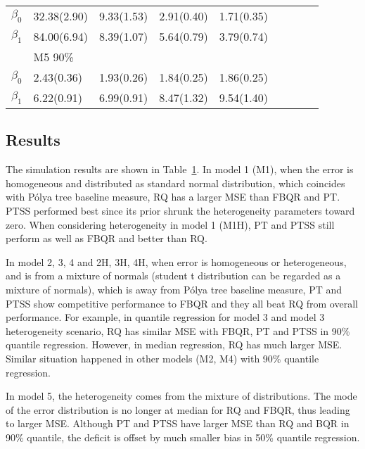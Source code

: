 \documentclass[12pt]{article}
\newcommand{\polya}{P\'{o}lya}
\begin{document}
\begin{center}
\begin{table}[h]
\begin{tabular}[tb]{cllllllll}
      $\beta_0$ & 32.38(2.90) & 9.33(1.53)  & 2.91(0.40)  & 1.71(0.35)  &             &             &             &             \\
      $\beta_1$ & 84.00(6.94) & 8.39(1.07)  & 5.64(0.79)  & 3.79(0.74)  &             &             &             &             \\
                & M5 90\%     &             &             &             &             &             &             &             \\
      $\beta_0$ & 2.43(0.36)  & 1.93(0.26)  & 1.84(0.25)  & 1.86(0.25)  &             &             &             &             \\
      $\beta_1$ & 6.22(0.91)  & 6.99(0.91)  & 8.47(1.32)  & 9.54(1.40)  &             &             &             &             \\
\hline
    \end{tabular}
    \label{ch2:tab:m1}
  \end{table}
\end{center}

\subsection{Results}
The simulation results are shown in Table~\ref{ch2:tab:m1}.
In model 1 (M1), when the error is homogeneous and distributed as standard normal distribution, which coincides with \polya{} tree baseline measure, RQ has a larger MSE than FBQR and PT.
PTSS performed best since its prior shrunk the heterogeneity parameters toward zero.
When considering heterogeneity in model 1 (M1H), PT and PTSS still perform as well as FBQR and better than RQ.

In model 2, 3, 4 and 2H, 3H, 4H, when error is homogeneous or heterogeneous, and is from a mixture of normals (student t distribution can be regarded as a mixture of normals), which is away from \polya{} tree baseline measure,
PT and PTSS show competitive performance to FBQR and they all beat RQ from overall performance.
For example, in quantile regression for model 3 and model 3 heterogeneity scenario, RQ has similar MSE with FBQR, PT and PTSS in 90\% quantile regression.
However, in median regression, RQ has much larger MSE.
Similar situation happened in other models (M2, M4) with 90\% quantile regression.

In model 5, the heterogeneity comes from the mixture of distributions.
The mode of the error distribution is no longer at median for RQ and FBQR, thus leading to larger MSE.
Although PT and PTSS have larger MSE than RQ and BQR in 90\% quantile, the deficit is offset by much smaller bias in 50\% quantile regression.
\end{document}
